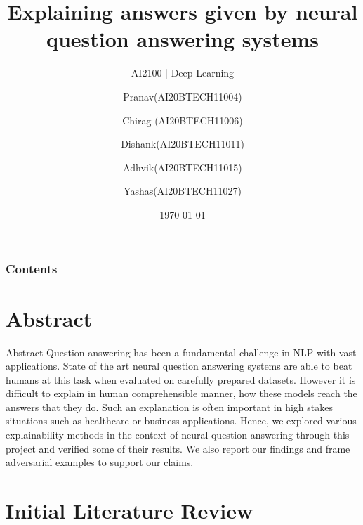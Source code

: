\documentclass[10pt]{beamer}
\title{Explaining answers given by neural question answering systems}
\subtitle{AI2100 | Deep Learning}
\author[{Group-35}]{ Pranav(AI20BTECH11004)  \and Chirag (AI20BTECH11006)
\and Dishank(AI20BTECH11011) \and Adhvik(AI20BTECH11015)\and Yashas(AI20BTECH11027)}
\institute{IIT Hyderabad}
\date{\today}
\begin{document}
\frame{\titlepage}
\begin{frame}
\frametitle{Contents}
\tableofcontents
\end{frame}
\section{Abstract}
\begin{frame}{Abstract}
Question answering has been a fundamental challenge in NLP with vast applications. State of the art neural question answering systems are able to beat humans at this task when evaluated on carefully prepared datasets. However it is difficult to explain in human comprehensible manner, how these models reach the answers that they do. Such an explanation is often important in high stakes situations such as healthcare or business applications. Hence, we explored various explainability methods in the context of neural question answering through this project and verified some of their results. We also report our findings and frame adversarial examples to support our claims.
\end{frame}

\section{Initial Literature Review}
\end{document}
